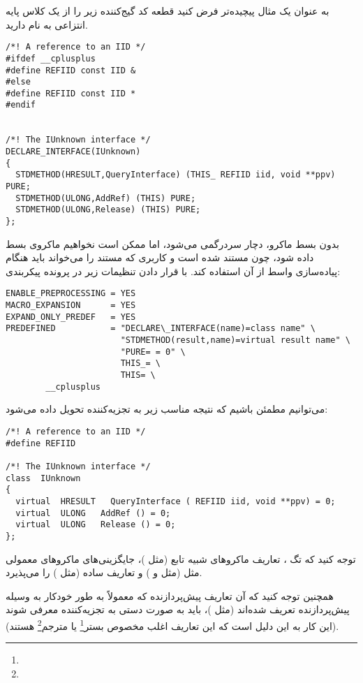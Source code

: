 به عنوان یک مثال پیچیده‌تر فرض کنید قطعه کد گیج‌کننده زیر را از یک کلاس پایه انتزاعی به نام  دارید.
\begin{latin}
\lstset{language=C++}  
\begin{lstlisting}[frame=single] 
/*! A reference to an IID */
#ifdef __cplusplus
#define REFIID const IID &
#else
#define REFIID const IID *
#endif


/*! The IUnknown interface */
DECLARE_INTERFACE(IUnknown)
{
  STDMETHOD(HRESULT,QueryInterface) (THIS_ REFIID iid, void **ppv) PURE;
  STDMETHOD(ULONG,AddRef) (THIS) PURE;
  STDMETHOD(ULONG,Release) (THIS) PURE;
};
\end{lstlisting}
\end{latin}
بدون بسط ماکرو،  دچار سردرگمی می‌شود، اما ممکن است نخواهیم ماکروی  بسط داده شود، 
چون مستند شده است و  کاربری که مستند را می‌خواند باید هنگام پیاده‌سازی واسط از آن استفاده کند. با قرار دادن تنظیمات
زیر در پرونده پیکربندی: 
\begin{latin}
\lstset{language=C++}  
\begin{lstlisting}[frame=single] 
ENABLE_PREPROCESSING = YES
MACRO_EXPANSION      = YES
EXPAND_ONLY_PREDEF   = YES
PREDEFINED           = "DECLARE\_INTERFACE(name)=class name" \
                       "STDMETHOD(result,name)=virtual result name" \
                       "PURE= = 0" \
                       THIS_= \
                       THIS= \
        __cplusplus
\end{lstlisting}
\end{latin}
می‌توانیم مطمئن باشیم که نتیجه مناسب زیر به تجزیه‌کننده  تحویل داده می‌شود:
\begin{latin}
\lstset{language=C++}  
\begin{lstlisting}[frame=single] 
/*! A reference to an IID */
#define REFIID

/*! The IUnknown interface */
class  IUnknown
{
  virtual  HRESULT   QueryInterface ( REFIID iid, void **ppv) = 0;
  virtual  ULONG   AddRef () = 0;
  virtual  ULONG   Release () = 0;
};
\end{lstlisting}
\end{latin}
توجه کنید که تگ \lr{PREDEFINED}، تعاریف ماکروهای شبیه تابع (مثل )، جایگزینی‌های ماکروهای 
معمولی مثل (مثل \lr{PURE} و ) و تعاریف ساده (مثل ) را می‌پذیرد. 

همچنین توجه کنید که آن تعاریف پیش‌پردازنده که معمولاً به طور خودکار به وسیله پیش‌پردازنده تعریف شده‌اند (مثل )، 
باید به صورت دستی به تجزیه‌کننده  معرفی شوند (این کار به این دلیل است که این تعاریف اغلب مخصوص 
بستر\footnote{\lr{Platform}} یا مترجم\footnote{\lr{Compiler}} هستند).

